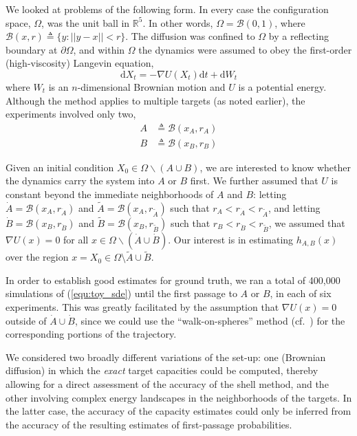 \documentclass[12pt, nofootinbib,english, amsmath, amssymb, aps, priprint, graphicx,floatfix]{revtex4-1}
\theoremstyle{plain}
\theoremstyle{definition}
\theoremstyle{plain}
\newcommand{\bb}[1]{\mathcal{B}\left(#1\right)}
\newcommand{\dA}{{\dot A}}
\newcommand{\tA}{{\tilde A}}
\newcommand{\dB}{{\dot B}}
\newcommand{\tB}{{\tilde B}}
\begin{document}
We looked at problems of the following form.  In every case the configuration space,
$\Omega$, was the unit ball in $\mathbb{R}^5$.  In other words, 
$\Omega = \bb{0,1}$, where $\bb{x, r} \triangleq \{ y : || y - x || < r \}$. The diffusion was confined to $\Omega$ by a reflecting boundary at $\partial\Omega$, and within $\Omega$ the dynamics were assumed to obey the first-order (high-viscosity) Langevin equation,
\begin{equation}
\label{equ:toy_sde}
\mathrm{d} X_t = - \nabla U (X_t) \mathrm{d} t + \mathrm{d} W_t
\end{equation}
where $W_t$ is an $n$-dimensional Brownian motion and
$U$ is a potential energy. Although the method applies to multiple targets (as noted earlier), the experiments involved only  two,
\begin{align*}
A &\triangleq \bb {x_A, r_A}\\
B &\triangleq \bb {x_B, r_B}
\end{align*}

Given an initial condition $X_0\in \Omega \backslash (A\cup B)$, we are interested to know whether the dynamics carry the system into $A$ or $B$ first.  We further assumed that $U$ is constant beyond the immediate neighborhoods of $A$ and $B$: letting $\dA=\bb{x_A,r_\dA }$ and $\tA=\bb{x_A,r_\tA }$ such that $r_A<r_\dA<r_\tA$, and letting $\dB=\bb{x_B,r_\dB }$ and  $\tB=\bb{x_B,r_\tB}$ such that $r_B<r_\dB<r_\tB$, we assumed that $\nabla U(x)=0$ for all $x\in\Omega\backslash (\dA\cup\dB)$.  Our interest is in estimating $h_{A,B}(x)$ over the region $x=X_0 \in \Omega\setminus \tA \cup \tB$.  

In order to establish good estimates for ground truth, 
we ran a total of 400,000 simulations of (\ref{equ:toy_sde}) 
until the first passage to $A$ or $B$, 
in each of six experiments. This was greatly facilitated by
the assumption that
 $\nabla U(x)=0$ outside of $\dA\cup\dB$, since we could use
 the ``walk-on-spheres'' method (cf.\ \cite{bingham1972random})
for the corresponding portions of the trajectory.

We considered two broadly different variations of the set-up: one (Brownian diffusion) in which the
{\em exact} target capacities could be computed, thereby allowing for a direct assessment of the accuracy of the shell method,  and the other involving complex energy landscapes in the neighborhoods of the targets. In the latter case, the accuracy of the capacity estimates could only be inferred from the accuracy of the resulting estimates of first-passage probabilities.
\end{document}
